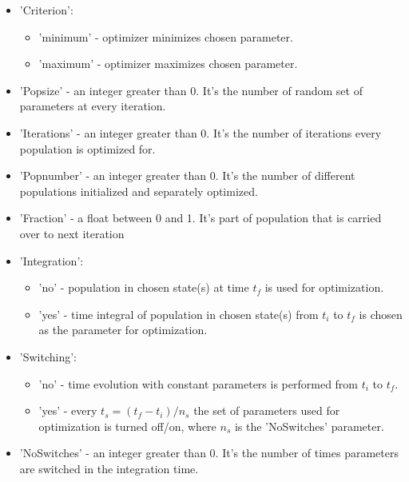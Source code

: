 \documentclass{article}
\numberwithin{equation}{section}
\numberwithin{figure}{section}
\numberwithin{table}{section}
\begin{document}
\begin{itemize}
\begin{itemize}

\item 'Criterion':

\begin{itemize}
\item 'minimum' - optimizer minimizes chosen parameter.
\item 'maximum' - optimizer maximizes chosen parameter. 
\end{itemize}

\item 'Popsize' - an integer greater than 0. It's the number of random set of parameters at every iteration.

\item 'Iterations' - an integer greater than 0. It's the number of iterations every population is optimized for.

\item 'Popnumber' - an integer greater than 0. It's the number of different populations initialized and separately optimized.

\item 'Fraction' - a float between 0 and 1. It's part of population that is carried over to next iteration

\item 'Integration':

\begin{itemize}
\item 'no' - population in chosen state(s) at time $t_f$ is used for optimization. 
\item 'yes' - time integral of population in chosen state(s) from $t_i$ to $t_f$ is chosen as the parameter for optimization.
\end{itemize}

\item 'Switching':

\begin{itemize}
\item 'no' - time evolution with constant parameters is performed from $t_i$ to $t_f$.
\item 'yes' -  every $t_s=(t_f-t_i)/n_s$ the set of parameters used for optimization is turned off/on, where $n_s$ is the 'NoSwitches' parameter.
\end{itemize}

\item 'NoSwitches' - an integer greater than 0. It's the number of times parameters are switched in the integration time.


\end{itemize}
\end{itemize}
\end{document}

